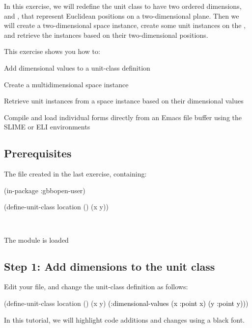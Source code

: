 \documentclass[10pt,twoside,english,pdftex]{article}
\begin{document}
In this exercise, we will redefine the  unit class to
have two ordered dimensions,  and , that represent
Euclidean positions on a two-dimensional plane.  Then we will create a
two-dimensional  space instance, create some
 unit instances on the , and retrieve
the instances based on their two-dimensional positions.

\fndocrule

This exercise shows you how to:
\begin{tightitemize}
\item Add dimensional values to a unit-class definition
\item Create a multidimensional space instance
\item Retrieve unit instances from a space instance based on their
  dimensional values
\item Compile and load individual forms directly from an Emacs file
  buffer using the SLIME or ELI environments
\end{tightitemize}

\fndocrule

\subsection*{Prerequisites}

\begin{tightitemize}
\item The  file created in the last exercise, containing:
%
\W\supp\notpretop
\begin{example}
\textcolor{darkergray}{%
  (in-package :gbbopen-user)

  (define-unit-class location ()
    (x y))}
\end{example}
\W\\

\item The  module is loaded
\end{tightitemize}

\subsection*{Step 1: Add dimensions to the  unit class}

Edit your  file, and change the
 unit-class definition as follows:
%
\W\supp
\begin{example}
\textcolor{darkergray}{%
  (define-unit-class location ()
    (x y)
    \textcolor{black}{(:dimensional-values
      (x :point x)
      (y :point y))})}
\end{example}
%
In this tutorial, we will highlight code additions and changes using a
black font.
\end{document}
